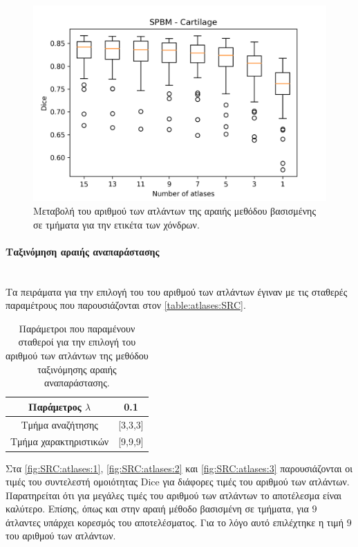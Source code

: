 \documentclass[a4paper,12pt]{article}
\newcommand{\paragraphLine}[1]{\paragraph{#1}\mbox{}\\}
\begin{document}
\begin{figure}[H]
    \centering
    \includegraphics[width=0.85\linewidth]{SPBM_Number_of_atlases_Cartilage_plot.png}
    \caption{Μεταβολή του αριθμού των ατλάντων της αραιής μεθόδου βασισμένης σε
             τμήματα για την ετικέτα των χόνδρων.}
    \label{fig:SPBM:atlases:3}
\end{figure}

\paragraphLine{Ταξινόμηση αραιής αναπαράστασης}

Τα πειράματα για την επιλογή του του αριθμού των ατλάντων έγιναν με τις σταθερές
παραμέτρους που παρουσιάζονται στον \autoref{table:atlases:SRC}.

\begin{table}[h!]
    \centering
    \begin{tabular}{|c|c|} 
        \hline
        Παράμετρος $\lambda$ & 0.1 \\ 
        \hline
        Τμήμα αναζήτησης & [3,3,3] \\ 
        \hline
        Τμήμα χαρακτηριστικών & [9,9,9] \\ 
        \hline
    \end{tabular}
    \caption{Παράμετροι που παραμένουν σταθεροί για την επιλογή του αριθμού των
             ατλάντων της μεθόδου ταξινόμησης αραιής αναπαράστασης.}
    \label{table:atlases:SRC}
\end{table}

Στα \autoref{fig:SRC:atlases:1}, \autoref{fig:SRC:atlases:2} και
\autoref{fig:SRC:atlases:3} παρουσιάζονται οι τιμές του συντελεστή ομοιότητας
Dice για διάφορες τιμές του αριθμού των ατλάντων. Παρατηρείται ότι για μεγάλες
τιμές του αριθμού των ατλάντων το αποτέλεσμα είναι καλύτερο. Επίσης, όπως και
στην αραιή μέθοδο βασισμένη σε τμήματα, για $9$ άτλαντες υπάρχει κορεσμός του
αποτελέσματος. Για το λόγο αυτό επιλέχτηκε η τιμή $9$ του αριθμού των ατλάντων.
\end{document}
